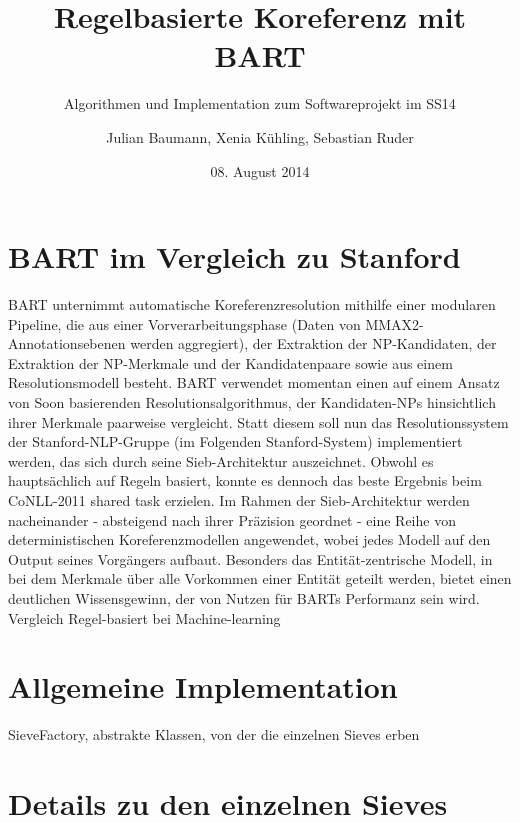 \documentclass{scrartcl}
\author{Julian Baumann, Xenia K\"uhling, Sebastian Ruder}
\date{08. August 2014}
\title{Regelbasierte Koreferenz mit BART}
\subtitle{Algorithmen und Implementation zum Softwareprojekt im SS14}
\begin{document}
\maketitle

\section{BART im Vergleich zu Stanford}

BART unternimmt automatische Koreferenzresolution mithilfe einer modularen Pipeline, die aus einer Vorverarbeitungsphase (Daten von MMAX2-Annotationsebenen werden aggregiert), der Extraktion der NP-Kandidaten, der Extraktion der NP-Merkmale und der Kandidatenpaare sowie aus einem Resolutionsmodell besteht.
 BART verwendet momentan einen auf einem Ansatz von Soon basierenden Resolutionsalgorithmus, der Kandidaten-NPs hinsichtlich ihrer Merkmale paarweise vergleicht. Statt diesem soll nun das Resolutionssystem der Stanford-NLP-Gruppe (im Folgenden Stanford-System) implementiert werden, das sich durch seine Sieb-Architektur auszeichnet. Obwohl es haupts\"achlich auf Regeln basiert, konnte es dennoch das beste Ergebnis beim CoNLL-2011 shared task erzielen. Im Rahmen der Sieb-Architektur werden nacheinander - absteigend nach ihrer Pr\"azision geordnet - eine Reihe von deterministischen Koreferenzmodellen angewendet, wobei jedes Modell auf den Output seines Vorg\"angers aufbaut. Besonders das Entit\"at-zentrische Modell, in bei dem Merkmale \"uber alle Vorkommen einer Entit\"at geteilt werden, bietet einen deutlichen Wissensgewinn, der von Nutzen f\"ur BARTs Performanz sein wird.
Vergleich Regel-basiert bei Machine-learning

\section{Allgemeine Implementation}

SieveFactory, abstrakte Klassen, von der die einzelnen Sieves erben

\section{Details zu den einzelnen Sieves}
\end{document}
